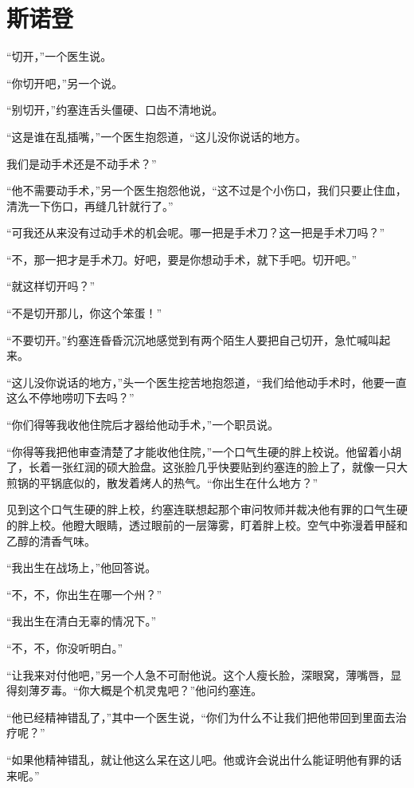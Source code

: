 \chapter{斯诺登}
 
    “切开，”一个医生说。

    “你切开吧，”另一个说。

    “别切开，”约塞连舌头僵硬、口齿不清地说。

    “这是谁在乱插嘴，”一个医生抱怨道，“这儿没你说话的地方。

    我们是动手术还是不动手术？”

    “他不需要动手术，”另一个医生抱怨他说，“这不过是个小伤口，我们只要止住血，清洗一下伤口，再缝几针就行了。”

    “可我还从来没有过动手术的机会呢。哪一把是手术刀？这一把是手术刀吗？”

    “不，那一把才是手术刀。好吧，要是你想动手术，就下手吧。切开吧。”

    “就这样切开吗？”

    “不是切开那儿，你这个笨蛋！”

    “不要切开。”约塞连昏昏沉沉地感觉到有两个陌生人要把自己切开，急忙喊叫起来。

    “这儿没你说话的地方，”头一个医生挖苦地抱怨道，“我们给他动手术时，他要一直这么不停地唠叨下去吗？”

    “你们得等我收他住院后才器给他动手术，”一个职员说。

    “你得等我把他审查清楚了才能收他住院，”一个口气生硬的胖上校说。他留着小胡了，长着一张红润的硕大脸盘。这张脸几乎快要贴到约塞连的脸上了，就像一只大煎锅的平锅底似的，散发着烤人的热气。“你出生在什么地方？”

    见到这个口气生硬的胖上校，约塞连联想起那个审问牧师并裁决他有罪的口气生硬的胖上校。他瞪大眼睛，透过眼前的一层簿雾，盯着胖上校。空气中弥漫着甲醛和乙醇的清香气味。

    “我出生在战场上，”他回答说。

    “不，不，你出生在哪一个州？”

    “我出生在清白无辜的情况下。”

    “不，不，你没听明白。”

    “让我来对付他吧，”另一个人急不可耐他说。这个人瘦长脸，深眼窝，薄嘴唇，显得刻薄歹毒。“你大概是个机灵鬼吧？”他问约塞连。

    “他已经精神错乱了，”其中一个医生说，“你们为什么不让我们把他带回到里面去治疗呢？”

    “如果他精神错乱，就让他这么呆在这儿吧。他或许会说出什么能证明他有罪的话来呢。”

